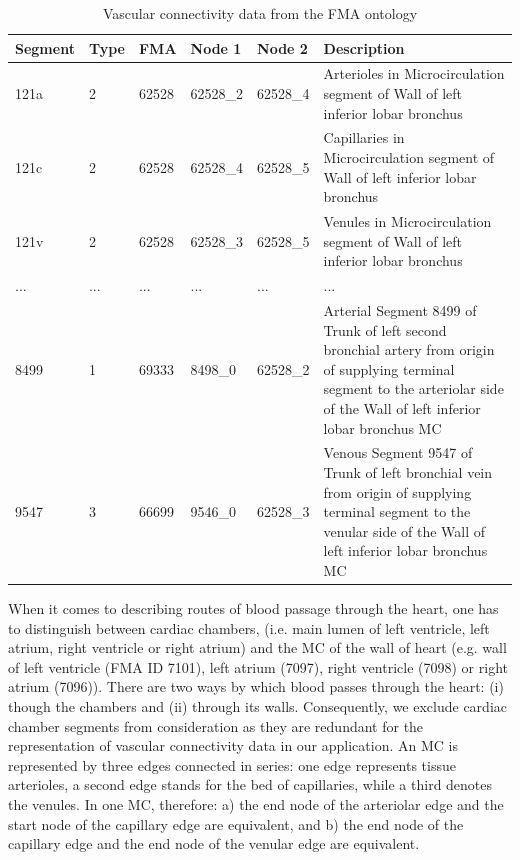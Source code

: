 \begin{table}
\caption{Vascular connectivity data from the FMA ontology}
\begin{tabular}{|l|l|l|l|l|p{7cm}|}
  \hline
  Segment & Type & FMA & Node 1 & Node 2 & Description \\
  \hline
  121a & 2 & 62528 & 62528\_2 & 62528\_4 & Arterioles in Microcirculation segment of Wall of left inferior lobar bronchus \\
  121c & 2 & 62528 & 62528\_4 & 62528\_5 & Capillaries in Microcirculation segment of Wall of left inferior lobar bronchus\\
  121v & 2 & 62528 & 62528\_3 & 62528\_5 & Venules in Microcirculation segment of Wall of left inferior lobar bronchus\\
  ... &... & ...   & ...      & ...      & ...\\
  8499 & 1 & 69333 & 8498\_0 & 62528\_2  & Arterial Segment 8499 of Trunk
of left second bronchial artery from origin of supplying terminal segment
to the arteriolar side of the Wall of left inferior lobar bronchus
MC\\
  9547 & 3 & 66699 & 9546\_0 & 62528\_3 & Venous Segment 9547 of Trunk of
left bronchial vein from origin of supplying terminal segment to the
venular side of the Wall of left inferior lobar bronchus MC \\
  \hline
\end{tabular}
\label{tab:vascular-connectivity}
\end{table}

When it comes to describing routes of blood passage through the heart, one has to distinguish between cardiac chambers, (i.e. main lumen of left ventricle, left atrium, right ventricle or right atrium) and the MC of the wall of heart (e.g. wall of left ventricle (FMA ID 7101), left atrium (7097), right ventricle (7098) or right atrium (7096)). There are two ways by which blood passes through the heart: (i) though the chambers and (ii) through its walls. Consequently, we exclude cardiac chamber segments from consideration as they are redundant for the representation of vascular connectivity data in our application.
An MC is represented by three edges connected in series: one edge represents tissue arterioles, a second edge stands for the bed of
capillaries, while a third denotes the venules. In one MC, therefore: a) the end node of the arteriolar edge and the start node of the
capillary edge are equivalent, and b) the end node of the capillary edge and the end node of the venular
edge are equivalent.

